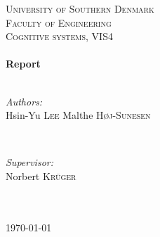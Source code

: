 \begin{titlepage}

		\center
		\textsc{\LARGE University of Southern Denmark\\Faculty of Engineering}\\[1.5cm] %
		\textsc{\Large Cognitive systems, VIS4}\\[0.5cm] %
		\HRule \\[0.4cm]

		{ \huge \bfseries Report\\[0.4cm]
		\HRule \\[1.5cm]}
		\begin{minipage}{0.4\textwidth}
			\begin{flushleft} \large
				\emph{Authors:}\\
				Hsin-Yu \textsc{Lee}
				\newline
				Malthe \textsc{Høj-Sunesen} %
			\end{flushleft}
		\end{minipage}
		~
		\begin{minipage}{0.4\textwidth}
			\begin{flushright} \large
				\emph{Supervisor:} \\
				Norbert \textsc{Krüger}\\~ %
			\end{flushright}
		\end{minipage}\\[4cm]


		{\large \today}\\[3cm] %
		\vfill %

	\end{titlepage}